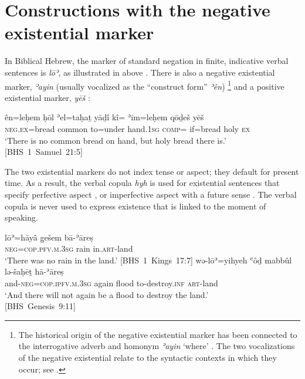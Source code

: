 \documentclass[output=paper,colorlinks,citecolor=brown,draft,draftmode]{langscibook}
\begin{document}
\section{Constructions with the negative existential
marker}\label{sec:Hebrew-2}

In Biblical Hebrew, the marker of standard negation in finite, indicative
verbal sentences is \textit{lōʾ}, as illustrated in
 above \parencite[see also][143--172]{Sjors2018}.
There is also a negative existential marker, \textit{ʾayin} (usually
vocalized as the ``construct form'' \textit{ʾên})%
%
    \footnote{The historical origin of the negative existential marker has
    been connected to the interrogative adverb and homonym \textit{ʾayin}
    `where' \parencite[see, e.g.][569]{JouonMuraoka2009}. The two
    vocalizations of the negative existential relate to the syntactic
    contexts in which they occur; see
    \cites{NaudeMiller2018}{NaudeMiller2019}.} 
%    
and a positive existential marker, \textit{yēš}
:
\begin{exe}\ex\label{ex:heb-just-holy-bread}
    \gll ên=leḥem ḥōl ʾel=taḥaṯ yāḏî kî= ʾim=leḥem qōḏeš yēš\\
\textsc{neg.ex}=bread common to=under   hand.1\textsc{sg} \textsc{comp}=
if=bread holy \textsc{ex} \\
    \glt `There is no common bread on hand, but holy bread there is.'\\
\mbox{[BHS 1 Samuel 21:5]}
\end{exe}
%
The two existential markers do not index tense or aspect; they default for
present time. As a result, the verbal copula \textit{hyh} is used for
existential sentences that specify perfective aspect
, or imperfective aspect with a future sense
. The verbal copula is never used to express existence that is linked to the moment of speaking.
%
\begin{exe}\ex\begin{xlist}
\ex\label{ex:heb-land-without-rain}
\gll lōʾ=hāyâ g̱ešem bā-ʾāreṣ\\
\textsc{neg}=\textsc{cop.pfv.m.3sg} rain in.\textsc{art}-land  \\
\glt `There was no rain in the land.' \mbox{[BHS 1
Kings 17:7]}
%
\ex\label{ex:heb-no-flood-again}
\gll wǝ-lōʾ=yihyeh ʿôḏ mabbûl lǝ-šaḥēṯ hā-ʾāreṣ\\
and-\textsc{neg}=\textsc{cop.ipfv.m.3sg} again flood to-destroy.\textsc{inf}
\textsc{art}-land\\
\glt `And there will not again be a flood to destroy the land.'\\
\mbox{[BHS Genesis 9:11]}
\end{xlist}\end{exe}
\end{document}
